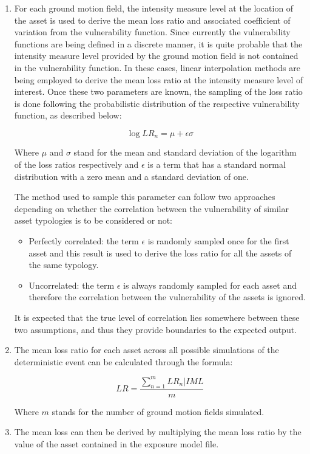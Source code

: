 \begin{enumerate}
\item For each ground motion field, the intensity measure level at the location of the asset is used to derive the mean loss ratio and associated coefficient of variation from the vulnerability function. Since currently the vulnerability functions are being defined in a discrete manner, it is quite probable that the intensity measure level provided by the ground motion field is not contained in the vulnerability function. In these cases, linear interpolation methods are being employed to derive the mean loss ratio at the intensity measure level of interest. Once these two parameters are known, the sampling of the loss ratio is done following the probabilistic distribution of the respective vulnerability function, as described below:

\begin{equation}
\log{LR_n} = \mu + \epsilon\sigma
\end{equation}

Where $\mu$ and $\sigma$ stand for the mean and standard deviation of the logarithm of the loss ratios respectively and $\epsilon$ is a term that has a standard normal distribution with a zero mean and a standard deviation of one.  

The method used to sample this parameter can follow two approaches depending on whether the correlation between the vulnerability of similar asset typologies is to be considered or not:

\begin{itemize}

\item Perfectly correlated: the term $\epsilon$ is randomly sampled once for the first asset and this result is used to derive the loss ratio for all the assets of the same typology. 

\item Uncorrelated: the term $\epsilon$ is always randomly sampled for each asset and therefore the correlation between the vulnerability of the assets is ignored.

\end{itemize}

It is expected that the true level of correlation lies somewhere between these two assumptions, and thus they provide boundaries to the expected output. 


\item The mean loss ratio for each asset across all possible simulations of the deterministic event can be calculated through the formula:

\begin{equation}
LR=\frac{\sum^m_{n=1}LR_n|IML}{m}
\end{equation}

Where $m$ stands for the number of ground motion fields simulated.

\item The mean loss can then be derived by multiplying the mean loss ratio by the value of the asset contained in the exposure model file.

\end{enumerate}

